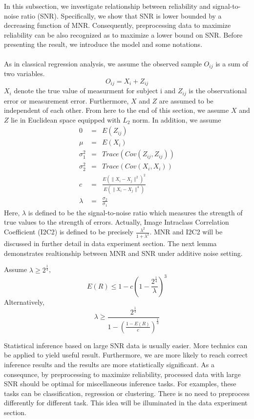 \documentclass{article}
\begin{document}
In this subsection, we investigate relationship between reliability and signal-to-noise ratio (SNR). Specifically, we show that SNR is lower bounded by a decreasing function of MNR. Consequently, preprocessing data to maximize reliability can be also recognized as to maximize a lower bound on SNR. Before presenting the result, we introduce the model and some notations. \\
\\
As in classical regression analysis, we assume the observed sample $O_{ij}$ is a sum of two variables.
\[O_{ij}=X_i+Z_{ij}\]
$X_i$ denote the true value of measurment for subject i and $Z_{ij}$ is the observational error or measurement error. Furthermore, $X$ and $Z$ are assumed to be independent of each other. From here to the end of this section, we assume $X$ and $Z$ lie in Euclidean space equipped with $L_2$ norm. In addition, we assume 
\begin{eqnarray*}
0&=& E(Z_{ij}) \\
\mu &=&E(X_i)\\
\sigma_1^2&=&Trace(Cov(Z_{ij},Z_{ij})) \\
\sigma_2^2&=&Trace(Cov(X_{i},X_{i}))\\
c&=&\frac{E(\|X_i-X_j \|^2)^2}{E(\|X_i-X_j \|^4)} \\
\lambda&=&\frac{\sigma_2}{\sigma_1} 
\end{eqnarray*}
Here, $\lambda$ is defined to be the signal-to-noise ratio which measures the strength of true values to the strength of errors. Actually, Image Intraclass Correlation Coefficient (I2C2) is defined to be precisely $\frac{\lambda^2}{1+\lambda^2}$. MNR and I2C2 will be discussed in further detail in data experiment section. The next lemma demonstrates realtionship between MNR and SNR under additive noise setting.

\begin{lem} 
Assume $\lambda \geq 2^{\frac{1}{4}}$, 
\[E(R) \leq 1-c(1-\frac{2^{\frac{1}{4}}}{\lambda})^3 \] 
Alternatively,
\[\lambda \geq \frac{2^{\frac{1}{4}}}{1-(\frac{1-E(R)}{c})^{\frac{1}{3}}} \]
\end{lem}
\noindent Statistical inference based on large SNR data is usually easier. More technics can be applied to yield useful result. Furthermore, we are more likely to reach correct inference results and the results are more statistically significant. As a consequnce, by preprocessing to maximize reliability, processed data with large SNR should be optimal for miscellaneous inference tasks. For examples, these tasks can be classification, regression or clustering. There is no need to preprocess differently for different task. This idea will be illuminated in the data experiment section.
\end{document}
